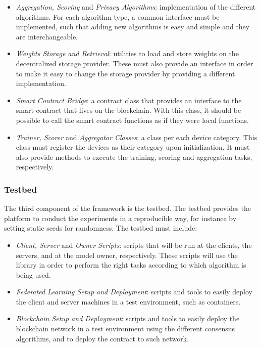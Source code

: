 \begin{itemize}
    \item \textit{Aggregation, Scoring} and \textit{Privacy Algorithms}: implementation of the different algorithms. For each algorithm type, a common interface must be implemented, such that adding new algorithms is easy and simple and they are interchangeable.
    
    \item \textit{Weights Storage and Retrieval}: utilities to load and store weights on the decentralized storage provider. These must also provide an interface in order to make it easy to change the storage provider by providing a different implementation.
    
    \item \textit{Smart Contract Bridge}: a contract class that provides an interface to the smart contract that lives on the blockchain. With this class, it should be possible to call the smart contract functions as if they were local functions.
    
    \item \textit{Trainer, Scorer} and \textit{Aggregator Classes}: a class per each device category. This class must register the devices as their category upon initialization. It must also provide methods to execute the training, scoring and aggregation tasks, respectively.
\end{itemize}

\subsubsection{Testbed}\label{meth:testbed}

The third component of the framework is the testbed. The testbed provides the platform to conduct the experiments in a reproducible way, for instance by setting static seeds for randomness. The testbed must include:

\begin{itemize}
    \item \textit{Client, Server} and \textit{Owner Scripts}: scripts that will be run at the clients, the servers, and at the model owner, respectively. These scripts will use the library in order to perform the right tasks according to which algorithm is being used.
    
    \item \textit{Federated Learning Setup and Deployment}: scripts and tools to easily deploy the client and server machines in a test environment, such as containers.
    
    \item \textit{Blockchain Setup and Deployment}: scripts and tools to easily deploy the blockchain network in a test environment using the different consensus algorithms, and to deploy the contract to such network.
\end{itemize}

